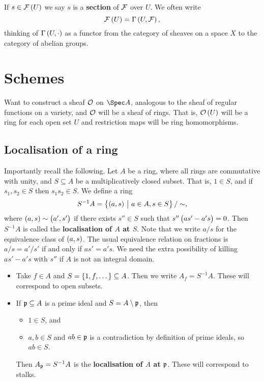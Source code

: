 \begin{remark*}
If $ s \in \FFF\br{U} $ we say $ s $ is a \textbf{section} of $ \mathcal{F} $ over $ U $. We often write
$$ \FFF\br{U} = \Gamma\br{U, \FFF}, $$
thinking of $ \Gamma\br{U, \cdot} $ as a functor from the category of sheaves on a space $ X $ to the category of abelian groups.
\end{remark*}

\pagebreak

\section{Schemes}

Want to construct a sheaf $ \mathcal{O} $ on $ \Spec A $, analogous to the sheaf of regular functions on a variety, and $ \mathcal{O} $ will be a sheaf of rings. That is, $ \OOO\br{U} $ will be a ring for each open set $ U $ and restriction maps will be ring homomorphisms.

\subsection{Localisation of a ring}

Importantly recall the following. Let $ A $ be a ring, where all rings are commutative with unity, and $ S \subseteq A $ be a multiplicatively closed subset. That is, $ 1 \in S $, and if $ s_1, s_2 \in S $ then $ s_1s_2 \in S $. We define a ring
$$ S^{-1}A = \cbr{\br{a, s} \st a \in A, s \in S} / \sim, $$
where $ \br{a, s} \sim \br{a', s'} $ if there exists $ s'' \in S $ such that $ s''\br{as' - a's} = 0 $. Then $ S^{-1}A $ is called the \textbf{localisation of $ A $ at $ S $}. Note that we write $ a / s $ for the equivalence class of $ \br{a, s} $. The usual equivalence relation on fractions is $ a / s = a' / s' $ if and only if $ as' = a's $. We need the extra possibility of killing $ as' - a's $ with $ s'' $ if $ A $ is not an integral domain.

\begin{example*}
\hfill
\begin{itemize}
\item Take $ f \in A $ and $ S = \cbr{1, f, \dots} \subseteq A $. Then we write $ A_f = S^{-1}A $. These will correspond to open subsets.
\item If $ \mathfrak{p} \subseteq A $ is a prime ideal and $ S = A \setminus \mathfrak{p} $, then
\begin{itemize}
\item $ 1 \in S $, and
\item $ a, b \in S $ and $ ab \in \mathfrak{p} $ is a contradiction by definition of prime ideals, so $ ab \in S $.
\end{itemize}
Then $ A_{\mathfrak{p}} = S^{-1}A $ is the \textbf{localisation of $ A $ at $ \mathfrak{p} $}. These will correspond to stalks.
\end{itemize}
\end{example*}

